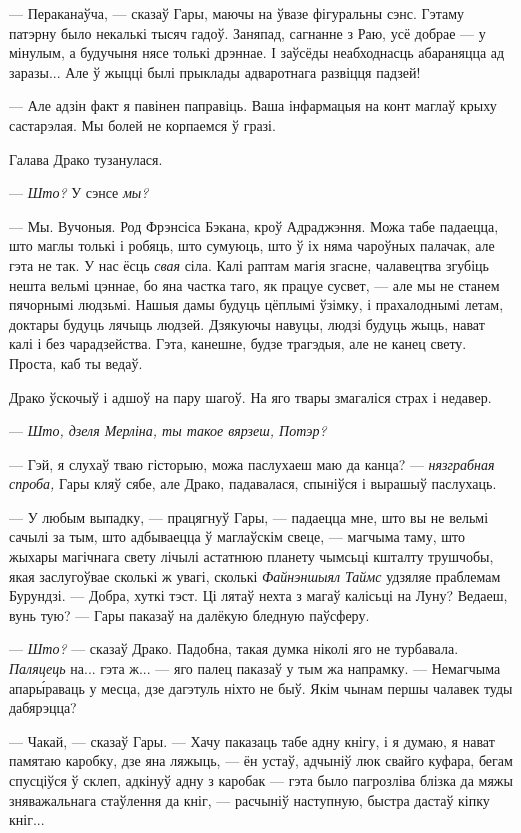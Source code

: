 --- Пераканаўча, --- сказаў Гары, маючы на ўвазе фігуральны сэнс. Гэтаму патэрну
было некалькі тысяч гадоў. Заняпад, сагнанне з Раю, усё добрае --- у мінулым, 
а будучыня нясе толькі дрэннае. І заўсёды неабходнасць абараняцца ад заразы...
Але ў жыцці былі прыклады адваротнага развіцця падзей!

--- Але адзін факт я павінен паправіць. Ваша інфармацыя на конт маглаў крыху
састарэлая. Мы болей не корпаемся ў гразі.

Галава Драко тузанулася.

--- \emph{Што?} У сэнсе \emph{мы?}

--- Мы. Вучоныя. Род Фрэнсіса Бэкана, кроў Адраджэння. Можа табе падаецца,
што маглы толькі і робяць, што сумуюць, што ў іх няма чароўных палачак,
але гэта не так. У нас ёсць \emph{свая} сіла. Калі раптам магія згасне, чалавецтва
згубіць нешта вельмі цэннае, бо яна частка таго, як працуе сусвет, --- але мы
не станем пячорнымі людзьмі. Нашыя дамы будуць цёплымі ўзімку, і прахалоднымі летам,
доктары будуць лячыць людзей. Дзякуючы навуцы, людзі будуць жыць, нават калі і без
чарадзейства. Гэта, канешне, будзе трагэдыя, але не канец свету. Проста, 
каб ты ведаў.

Драко ўскочыў і адшоў на пару шагоў. На яго твары змагаліся страх і недавер.

--- \emph{Што, дзеля Мерліна, ты такое вярзеш, Потэр?}

--- Гэй, я слухаў тваю гісторыю, можа паслухаеш маю да канца? --- \emph{нязграбная
спроба,} Гары кляў сябе, але Драко, падавалася, спыніўся і вырашыў паслухаць.

--- У любым выпадку, --- працягнуў Гары, --- падаецца мне, што вы не вельмі сачылі за 
тым, што адбываецца ў маглаўскім свеце, --- магчыма таму, што жыхары магічнага свету 
лічылі астатнюю планету чымсьці кшталту трушчобы, якая заслугоўвае сколькі ж 
увагі, сколькі \emph{Файнэншыял Таймс} удзяляе праблемам Бурундзі. --- Добра,
хуткі тэст. Ці лятаў нехта з магаў калісьці на Луну? Ведаеш, вунь тую? --- Гары паказаў 
на далёкую бледную паўсферу.

--- \emph{Што?} --- сказаў Драко. Падобна, такая думка ніколі яго не турбавала.
\emph{Паляцець} на... гэта ж... --- яго палец паказаў у тым жа напрамку. ---
Немагчыма апар\'ыраваць у месца, дзе дагэтуль ніхто не быў. Якім чынам першы чалавек
туды дабярэцца?
 
--- Чакай, --- сказаў Гары. --- Хачу паказаць табе адну кнігу, і я думаю, я
нават памятаю каробку, дзе яна ляжыць, --- ён устаў, адчыніў люк свайго куфара,
бегам спусціўся ў склеп, адкінуў адну з каробак --- гэта было пагрозліва блізка да
мяжы зняважальнага стаўлення да кніг, --- расчыніў наступную, быстра дастаў кіпку кніг...

